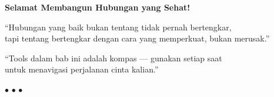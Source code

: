 \begin{center}

\vspace{0.5cm}

{\Large\bfseries\color{primary} Selamat Membangun Hubungan yang Sehat!}

\vspace{0.3cm}

{\color{warmgray} ``Hubungan yang baik bukan tentang tidak pernah bertengkar,\\
tapi tentang bertengkar dengan cara yang memperkuat, bukan merusak.''}

\vspace{0.3cm}

{\color{warmgray} ``Tools dalam bab ini adalah kompas --- gunakan setiap saat\\
untuk menavigasi perjalanan cinta kalian.''}

\vspace{0.5cm}

{\Large\color{accent} $\bullet$ \hspace{0.3cm} $\bullet$ \hspace{0.3cm} $\bullet$}
\end{center}
